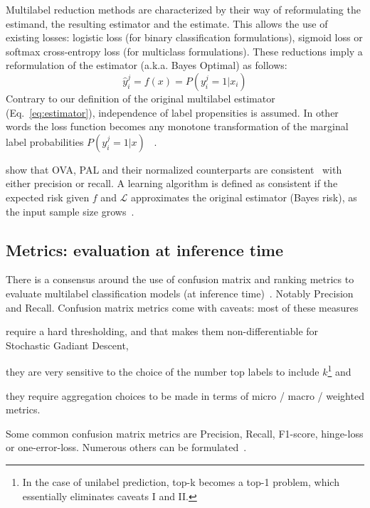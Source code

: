 \vspace{\baselineskip}

Multilabel reduction methods are characterized by their way of reformulating the estimand, the resulting estimator and the estimate. This allows the use of existing losses: logistic loss (for binary classification formulations), sigmoid loss or softmax cross-entropy loss (for multiclass formulations). These reductions imply a reformulation of the estimator (a.k.a. Bayes Optimal) as follows:
%
\begin{equation}
  \hat{y}_i^j = f(x) = P(y_i^j = 1 | x_i)
\end{equation}
%
Contrary to our definition of the original multilabel estimator (Eq.~\ref{eq:estimator}), independence of label propensities is assumed. In other words the loss function becomes any monotone transformation of the marginal label probabilities $P(y_i^j = 1 | x)$ ~\cite{OVA2, multilabelMetrics, unifiedView}.

\citet{multilabelReduction} show that OVA, PAL and their normalized counterparts are consistent~\citep{consistency-surrogates, consistency-multiclassSVM, consistency-lossAnalysis} with either precision or recall. A learning algorithm is defined as consistent if the expected risk given $f$ and $\mathcal{L}$ approximates the original estimator (Bayes risk), as the input sample size grows~\cite{consistencyMultilabel}.

\subsection{Metrics: evaluation at inference time}
\label{section:background:metrics}

There is a consensus around the use of confusion matrix  and ranking metrics to evaluate multilabel classification models (at inference time)~\cite{multilabelMetrics, weightedMetrics, unifiedView}. Notably Precision and Recall. Confusion matrix metrics come with caveats: most of these measures 
\begin{enumerate*}
\item require a hard thresholding, and that makes them non-differentiable for Stochastic Gadiant Descent, 
\item they are very sensitive to the choice of the number top labels to include $k$\footnote{In the case of unilabel prediction, top-k becomes a top-1 problem, which essentially eliminates caveats I and II.} and 
\item they require aggregation choices to be made in terms of micro / macro / weighted metrics.
\end{enumerate*}
Some common confusion matrix metrics are Precision, Recall, F1-score, hinge-loss or one-error-loss. Numerous others can be formulated~\cite{unifiedView}.


